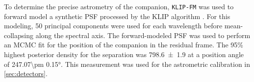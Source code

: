To determine the precise astrometry of the companion, \texttt{KLIP-FM} \citep{wang_pyklip_2015} was used to forward model a synthetic PSF processed by the KLIP algorithm \citep{pueyo_detection_2016}. For this modeling, 50 principal components were used for each wavelength before mean-collapsing along the spectral axis. The forward-modeled PSF was used to perform an MCMC fit for the position of the companion in the residual frame. The 95\% highest posterior density for the separation was \SI{798.6\pm 1.9}{\mas} at a position angle of \ang{247.07\pm 0.15}. This measurement was used for the astrometric calibration in \autoref{sec:detectors}.




